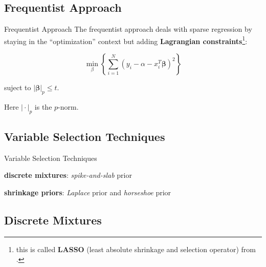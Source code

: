 \subsection{Frequentist Approach}
\begin{frame}{Frequentist Approach}
    The frequentist approach deals with sparse regression by staying in the
    ``optimization'' context but adding \textbf{Lagrangian constraints}\footnote{
        this is called \textbf{LASSO} (least absolute shrinkage and selection operator)
        from \textcite{tibshirani1996regression,zou2005regularization}.
    }:

    $$
        \min_\beta \left\{ \sum _{i=1}^N ( y_i - \alpha - x_i^T \boldsymbol{\beta} )^2 \right\}
    $$

    suject to $\vert \boldsymbol{\beta} \vert_p \leq t$.

    \vfill

    Here $\vert \cdot \vert_p$ is the $p$-norm.
\end{frame}

\subsection{Variable Selection Techniques}
\begin{frame}{Variable Selection Techniques}
    \begin{vfilleditems}
        \item \textbf{discrete mixtures}: \textit{spike-and-slab} prior
        \item \textbf{shrinkage priors}: \textit{Laplace} prior
              and \textit{horseshoe} prior \parencite{carvalho2009handling}
    \end{vfilleditems}
\end{frame}

\subsection{Discrete Mixtures}
